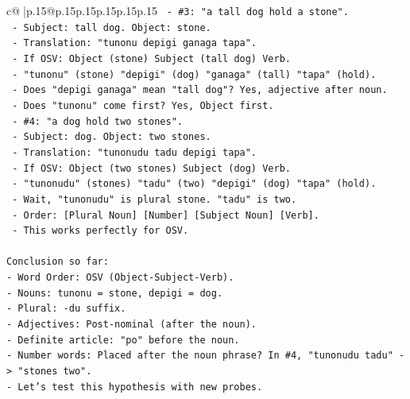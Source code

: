 \documentclass{article}
\begin{document}
{\begin{supertabular}{c@{$\;$}|p{.15\linewidth}@{}p{.15\linewidth}p{.15\linewidth}p{.15\linewidth}p{.15\linewidth}p{.15\linewidth}}
{{{\texttt{                {-} \#3: "a tall dog hold a stone".} \\
\texttt{                  {-} Subject: tall dog. Object: stone.} \\
\texttt{                  {-} Translation: "tunonu depigi ganaga tapa".} \\
\texttt{                  {-} If OSV: Object (stone) Subject (tall dog) Verb.} \\
\texttt{                  {-} "tunonu" (stone) "depigi" (dog) "ganaga" (tall) "tapa" (hold).} \\
\texttt{                  {-} Does "depigi ganaga" mean "tall dog"? Yes, adjective after noun.} \\
\texttt{                  {-} Does "tunonu" come first? Yes, Object first.} \\
\texttt{                {-} \#4: "a dog hold two stones".} \\
\texttt{                  {-} Subject: dog. Object: two stones.} \\
\texttt{                  {-} Translation: "tunonudu tadu depigi tapa".} \\
\texttt{                  {-} If OSV: Object (two stones) Subject (dog) Verb.} \\
\texttt{                  {-} "tunonudu" (stones) "tadu" (two) "depigi" (dog) "tapa" (hold).} \\
\texttt{                  {-} Wait, "tunonudu" is plural stone. "tadu" is two.} \\
\texttt{                  {-} Order: {[}Plural Noun{]} {[}Number{]} {[}Subject Noun{]} {[}Verb{]}.} \\
\texttt{                  {-} This works perfectly for OSV.} \\
\\ 
\texttt{Conclusion so far:} \\
\texttt{{-} Word Order: OSV (Object{-}Subject{-}Verb).} \\
\texttt{{-} Nouns: tunonu = stone, depigi = dog.} \\
\texttt{{-} Plural: {-}du suffix.} \\
\texttt{{-} Adjectives: Post{-}nominal (after the noun).} \\
\texttt{{-} Definite article: "po" before the noun.} \\
\texttt{{-} Number words: Placed after the noun phrase? In \#4, "tunonudu tadu" {-}> "stones two".} \\
\texttt{{-} Let's test this hypothesis with new probes.} \\
}}}
\end{supertabular}}
\end{document}
